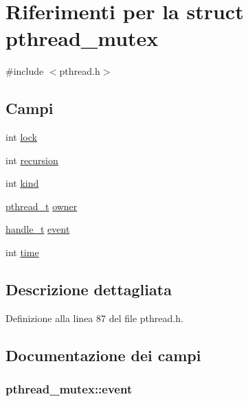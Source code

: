 \hypertarget{structpthread__mutex}{\section{Riferimenti per la struct pthread\+\_\+mutex}
\label{structpthread__mutex}
}


{\ttfamily \#include $<$pthread.\+h$>$}

\subsection*{Campi}
\begin{DoxyCompactItemize}
\item 
int \hyperlink{structpthread__mutex_a039843af2bfee5ac32a1c4452108b833}{lock}
\item 
int \hyperlink{structpthread__mutex_ad0a6948ac1d12f9ec3f11fea2ac07ff9}{recursion}
\item 
int \hyperlink{structpthread__mutex_a0a817c827021f648ceba78fb34b61f62}{kind}
\item 
\hyperlink{pthread_8h_a6766c2345d5c6fe6407d9f6b844e584a}{pthread\+\_\+t} \hyperlink{structpthread__mutex_a3d3ee80fcc9a148717677554d05d9d4a}{owner}
\item 
\hyperlink{pthread_8h_aea4188cfb1472f9bb606fd2566133e34}{handle\+\_\+t} \hyperlink{structpthread__mutex_a3fdfabe67e940844d49b5f98809907f3}{event}
\item 
int \hyperlink{structpthread__mutex_abd1e1875e0231a5dd6146adb8d6380c0}{time}
\end{DoxyCompactItemize}


\subsection{Descrizione dettagliata}


Definizione alla linea 87 del file pthread.\+h.



\subsection{Documentazione dei campi}
\hypertarget{structpthread__mutex_a3fdfabe67e940844d49b5f98809907f3}{
\subsubsection[{event}]{ pthread\+\_\+mutex\+::event}}\label{structpthread__mutex_a3fdfabe67e940844d49b5f98809907f3}


